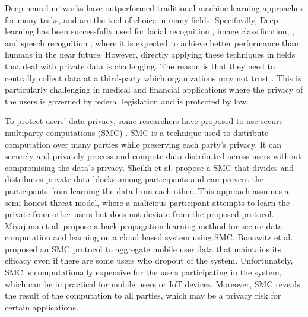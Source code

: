 \documentclass[conference]{IEEEtran}
\begin{document}
Deep neural networks have outperformed traditional machine learning approaches for many tasks, and are the tool of choice in many
fields. Specifically, Deep learning has been successfully used for facial recognition \cite{krizhevsky2012imagenet}, image classification, 
\cite{simard2003best}, and speech recognition \cite{hinton2012deep, graves2013speech }, where it is expected to achieve better
performance than humans in the near future. However, directly applying these techniques in fields that deal with private data is
challenging. The reason is that they need to centrally collect data at a third-party which organizations may not trust
\cite{chicurel2000databasing}. This is particularly challenging in medical and financial applications where the privacy of the users is
governed by federal legislation and is protected by law. 


To protect users' data privacy, some researchers have proposed to use secure multiparty computations (SMC) 
\cite{vaidya2003leveraging,7040943}. SMC is a technique used to distribute computation over many parties while preserving each party's privacy. It can securely and privately process and compute data distributed across users without compromising the data's privacy.
Sheikh et al. \cite{sheikh2010distributed} propose a SMC that divides and distributes private data blocks among participants and can
prevent the participants from learning the data from  each other. This approach assumes a semi-honest threat model,
where a malicious  participant attempts to learn the private from other users but does not deviate from the proposed
protocol. 
Miyajima et al. \cite{miyajima2016new} propose a back propagation learning method for secure data computation and learning on a cloud
based system using SMC. %
Bonawitz et al. \cite{bonawitz2017practical}  proposed an SMC protocol to aggregate mobile user data that maintains its efficacy even if there are some users who dropout of the system. 
Unfortunately, SMC is computationally expensive for the users participating in the system, which can be impractical for mobile users or IoT devices. Moreover, SMC reveals the result of the computation to all parties, which may be a privacy risk for certain
applications. 
\end{document}
